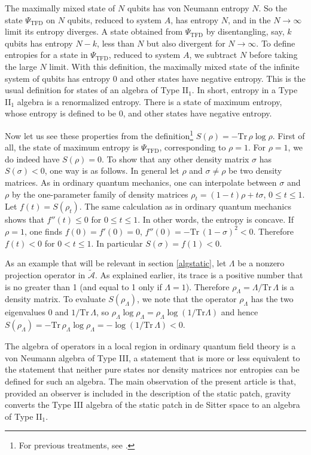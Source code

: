 \documentclass[11pt,a4paper]{article}
\def\t{{ \sf t}}
\def\A{{\mathcal A}}
\def\t{\widetilde }
\def\Tr{{\mathrm{Tr}}}
\def\TFD{{\mathrm{TFD}}}
\begin{document}
 The maximally mixed state of $N$
qubits has von Neumann entropy $N$.    So the state $\Psi_\TFD$
on $N$ qubits, reduced to system $A$, has entropy $N$, and in the $N\to\infty$ limit its entropy diverges.   A state obtained from $\Psi_\TFD$ by
disentangling, say, $k$  qubits has entropy $N-k$, less than $N$ but also divergent for $N\to\infty$.    To define entropies for a state in $\Psi_\TFD$,
reduced to system $A$, we subtract $N$ before taking the large $N$ limit.    With this definition, the maximally mixed state of the infinite system
of qubits has entropy 0 and other states have negative entropy.   This is the usual definition for states of an algebra of Type II$_1$.  In short,
entropy in a Type II$_1$ algebra is a renormalized entropy.   There is a state of maximum entropy, whose entropy is defined to be 0, and
other states have negative entropy.


Now let us see these properties from the definition\footnote{For previous treatments, see \cite{Segal,LongoWitten}.} $S(\rho)=-\Tr\,\rho\log\rho$.   First of all, the state of maximum entropy is $\Psi_\TFD$, corresponding to $\rho=1$.
For $\rho=1$, we do indeed have $S(\rho)=0$.  To show that any other density matrix $\sigma$ has $S(\sigma)<0$, one way is as follows.  In general
   let $\rho$ and $\sigma\not=\rho$ be two density matrices.  As in ordinary quantum mechanics, one can interpolate between $\sigma$ and $\rho$ by the one-parameter
   family of density matrices $\rho_t=(1-t)\rho+t\sigma$, $0\leq t\leq 1$.  Let $f(t) =S(\rho_t)$.    The same calculation as in ordinary quantum mechanics
   shows that $f''(t)\leq 0$ for $0\leq t\leq 1$.   In other words, the entropy is concave.   
   If $\rho=1$, one finds $f(0)=f'(0)=0$, $f''(0)= -\Tr\,(1-\sigma)^2<0$. Therefore $f(t)< 0$ for $0< t\leq 1$.
   In particular $S(\sigma)=f(1)<0$.    
   
   As an example that will be relevant in section \ref{algstatic}, let $\Lambda$ be a nonzero projection operator in $\t\A$.  As explained earlier, its
   trace is a positive number that is no greater than 1 (and equal to 1 only if $\Lambda=1$).  Therefore $\rho_\Lambda=\Lambda/\Tr\,\Lambda$ is
   a density matrix.   To evaluate $S(\rho_\Lambda)$, we note
    that the operator $\rho_\Lambda$ has the two eigenvalues 0 and $1/\Tr\,\Lambda$, so $\rho_\Lambda \log \rho_\Lambda=\rho_\Lambda \log(1/\Tr\Lambda)$
    and hence 
    $S(\rho_\Lambda)=-\Tr\,\rho_\Lambda\log\rho_\Lambda = -\log(1/\Tr\,\Lambda)<0$.
    
    The algebra of operators in a local region in ordinary quantum field theory is a von Neumann algebra of Type III, a statement that is more or less equivalent
    to the statement that neither pure states nor density matrices nor entropies can be defined for such an algebra.   The main observation of the present
    article is that, provided an observer is included in the description of the static patch, gravity converts the Type III algebra of the static patch in de Sitter
    space to an algebra of Type II$_1$.
\end{document}
